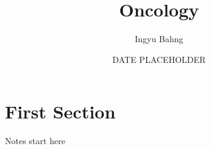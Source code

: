 \documentclass[10pt]{article}
\title{Oncology}
\date{DATE PLACEHOLDER}
\author{Ingyu Bahng}
\begin{document}


\section{First Section}

Notes start here
  
\end{document}
